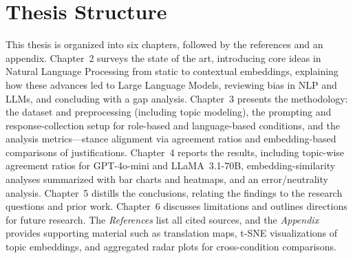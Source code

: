 \section{Thesis Structure}

This thesis is organized into six chapters, followed by the references and an appendix. Chapter~2 surveys the state of the art, introducing core ideas in Natural Language Processing from static to contextual embeddings, explaining how these advances led to Large Language Models, reviewing bias in NLP and LLMs, and concluding with a gap analysis. Chapter~3 presents the methodology: the dataset and preprocessing (including topic modeling), the prompting and response-collection setup for role-based and language-based conditions, and the analysis metrics—stance alignment via agreement ratios and embedding-based comparisons of justifications. Chapter~4 reports the results, including topic-wise agreement ratios for GPT-4o-mini and LLaMA~3.1-70B, embedding-similarity analyses summarized with bar charts and heatmaps, and an error/neutrality analysis. Chapter~5 distills the conclusions, relating the findings to the research questions and prior work. Chapter~6 discusses limitations and outlines directions for future research. The \textit{References} list all cited sources, and the \textit{Appendix} provides supporting material such as translation maps, t-SNE visualizations of topic embeddings, and aggregated radar plots for cross-condition comparisons.

